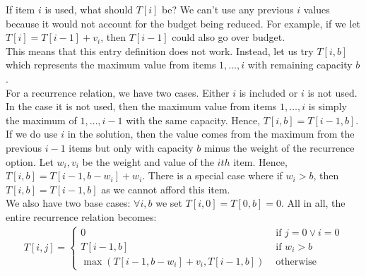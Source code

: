 \documentclass[14pt]{extarticle}
\begin{document}
    If item $i$ is used, what should $T[i]$ be? We can't use any previous $i$
    values because it would not account for the budget being reduced. For
    example, if we let $T[i] = T[i-1] + v_i$, then $T[i-1]$ could also go
    over budget.\\

    This means that this entry definition does not work. Instead, let us try
    $T[i, b]$ which represents the maximum value from items $1,\ldots, i$
    with remaining capacity $b$.\\

    For a recurrence relation, we have two cases. Either $i$ is included or
    $i$ is not used. In the case it is not used, then the maximum value from
    items $1, \ldots, i$ is simply the maximum of $1, \ldots, i-1$ with
    the same capacity. Hence, $T[i, b] = T[i-1, b]$.\\

    If we do use $i$ in the solution, then the value comes from the maximum
    from the previous $i-1$ items but only with capacity $b$ minus the weight
    of the recurrence option. Let $w_i, v_i$ be the weight and value of the
    $ith$ item. Hence, $T[i, b] = T[i-1, b-w_i] + w_i$. There is a special case
    where if $w_i > b$, then $T[i, b] = T[i-1, b]$ as we cannot afford this
    item.\\

    We also have two base cases: $\forall i, b$ we set $T[i, 0] = T[0, b] = 0$.
    All in all, the entire recurrence relation becomes:
    \begin{align*}
        T[i,j] = \begin{cases}
            0       & \text{ if } j = 0\lor i = 0        \\
            T[i-1, b] & \text{ if } w_i > b              \\
            \max\left(
                T[i-1,b-w_i] + v_i, T[i-1, b]
            \right) & \text{ otherwise}
        \end{cases}
    \end{align*}
    
    \pagebreak
\end{document}
